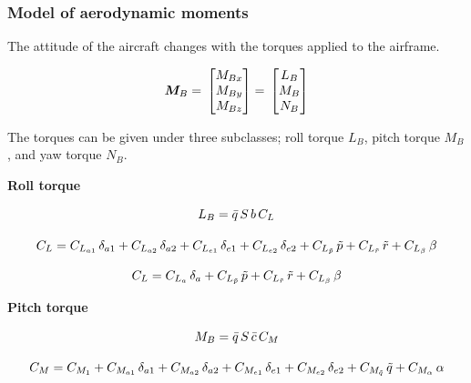 \subsubsection{Model of aerodynamic moments}

The attitude of the aircraft changes with the torques applied to the airframe. 

\begin{equation}{\label{eqn:torqueTotal}}
\bm{M}_B
= \,
\begin{bmatrix}
M_{Bx} \\
M_{By}\\
M_{Bz}\\
\end{bmatrix}
= \,
\begin{bmatrix}
L_{B} \\
M_{B}\\
N_{B}\\
\end{bmatrix}
\end{equation}

The torques can be given under three subclasses; roll torque $L_B$, pitch torque $M_B$, and yaw torque $N_B$.




\textbf{Roll torque}

\begin{equation}{\label{eqn:rollTorque}}
L_B = \bar{q} \, S \, b \, C_L
\end{equation}

\begin{equation}{\label{eqn:bigCraftC_L}}
C_L = C_{L_{a1}} \, \delta_{a1} + C_{L_{a2}} \, \delta_{a2} + C_{L_{e1}} \, \delta_{e1} + C_{L_{e2}} \, \delta_{e2} + C_{L_{\tilde{p}}} \, \tilde{p} + C_{L_{\tilde{r}}} \, \tilde{r} +  C_{L_\beta} \, \beta 
\end{equation}

\begin{equation}{\label{eqn:makoC_L}}
C_L = C_{L_{a}} \, \delta_{a} + C_{L_{\tilde{p}}} \, \tilde{p} + C_{L_{\tilde{r}}} \, \tilde{r} +  C_{L_\beta} \, \beta 
\end{equation}

\textbf{Pitch torque}

\begin{equation}{\label{eqn:pitchTorque}}
M_B = \bar{q} \, S \, \bar{c} \, C_M
\end{equation}

\begin{equation}{\label{eqn:bigCraftC_M}}
C_M = C_{M_{1}} + C_{M_{a1}} \, \delta_{a1} + C_{M_{a2}} \, \delta_{a2} + C_{M_{e1}} \, \delta_{e1} + C_{M_{e2}} \, \delta_{e2} + C_{M_{\tilde{q}}} \, \tilde{q} +  C_{M_\alpha} \, \alpha 
\end{equation}

